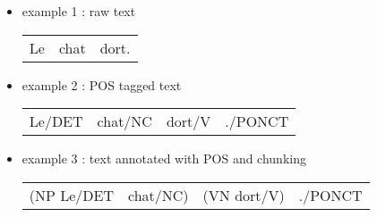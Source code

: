 \documentclass[manual-fr.tex]{subfiles}
\begin{document}
\begin{itemize}
	\item[] example 1 : raw text\\
	\begin{tabular}{ccc}Le & chat & dort.\end{tabular}
	\item[] example 2 : POS tagged text\\
	\begin{tabular}{cccc}Le/DET & chat/NC & dort/V & ./PONCT\end{tabular}
	\item[] example 3 : text annotated with POS and chunking\\
	\begin{tabular}{cccc}(NP Le/DET & chat/NC) & (VN dort/V) & ./PONCT\end{tabular}
\end{itemize}
\end{document}
